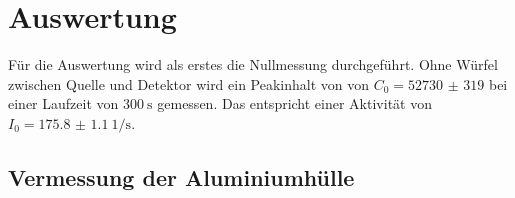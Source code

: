 \section{Auswertung}
\label{sec:Auswertung}
Für die Auswertung wird als erstes die Nullmessung durchgeführt. 
Ohne Würfel zwischen Quelle und Detektor wird ein Peakinhalt von 
von $C_{0}= \num{52730(319)}$ bei einer Laufzeit von $\SI{300}{\second}$ gemessen.
Das entspricht einer Aktivität von $I_{0}= \SI{175.8(11)}{1\per\second}$.
\subsection{Vermessung der Aluminiumhülle}
